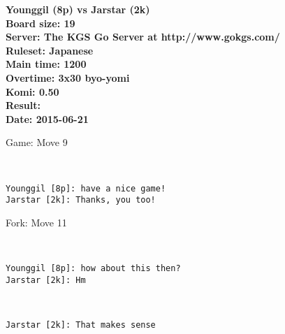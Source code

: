 \documentclass{article}
\begin{document}
\begin{titlepage}
    \null
    \vfill
    \begin{center}
        \textbf{Younggil (8p) vs Jarstar (2k)}\\
        \textbf{Board size: 19}\\
        \textbf{Server: The KGS Go Server at http://www.gokgs.com/}\\
        \textbf{Ruleset: Japanese}\\
        \textbf{Main time: 1200}\\
        \textbf{Overtime: 3x30 byo-yomi}\\
        \textbf{Komi: 0.50}\\
        \textbf{Result: }\\
        \textbf{Date: 2015-06-21}
    \end{center}
    \vfill
\end{titlepage}
\newpage
\tableofcontents
\newpage
\begin{section}{Game: Move 9}
\begin{center}
\cleargoban
{}
\showfullgoban
\\\begin{lstlisting}
Younggil [8p]: have a nice game!
Jarstar [2k]: Thanks, you too!
\end{lstlisting}
\end{center}
\end{section}
\begin{subsection}{Fork: Move 11}
\begin{center}
\cleargoban
{}
\smallgoban
\showfullgoban
\\\begin{lstlisting}
Younggil [8p]: how about this then?
Jarstar [2k]: Hm
\end{lstlisting}
\end{center}
\begin{center}
\cleargoban
{}
\normalgoban
\showfullgoban
\\\begin{lstlisting}
Jarstar [2k]: That makes sense
\end{lstlisting}
\end{center}
\end{subsection}
\end{document}

